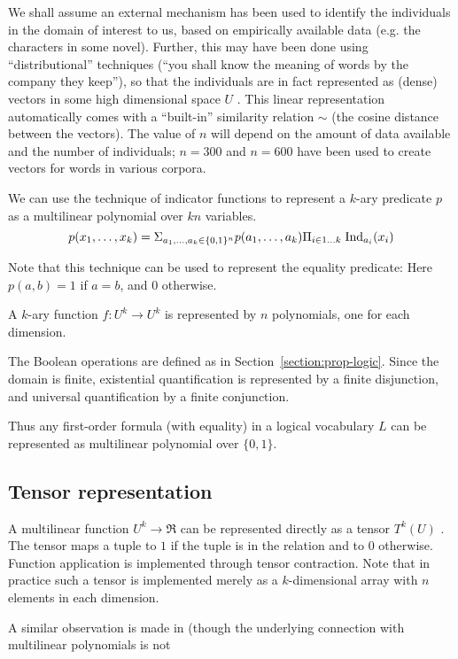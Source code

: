 \documentclass{article} %
\begin{document}
We shall assume an external mechanism has been used to identify the individuals in the domain of interest to us, based on empirically available data (e.g.{} the characters in some novel). Further, this may have been done using ``distributional'' techniques (``you shall know the meaning of words by the company they keep''), so that the individuals are in fact represented as (dense) vectors in some high dimensional space $U$ \cite{word-to-vec}. This linear representation automatically comes with a ``built-in'' similarity relation $\sim$ (the cosine distance between the vectors). The value of $n$ will depend on the amount of data available and the number of individuals; $n=300$ and $n=600$ have been used to create vectors for words in various corpora. 

We can use the technique of indicator functions to represent a $k$-ary predicate $p$ as a multilinear polynomial over $kn$ variables. 
$$p(x_1,\ldots, x_k)= \Sigma_{a_1,\ldots,a_k \in \{0,1\}^n} p(a_1, \ldots, a_k)  \Pi_{i \in 1\ldots k} \;\mbox{Ind}_{a_i}(x_i)$$

\noindent Note that this technique can be used to represent the equality predicate: Here $p(a,b)=1$ if $a=b$, and $0$ otherwise.

A $k$-ary function $f:U^k \rightarrow U^k$ is represented by $n$ polynomials, one for each dimension.

The Boolean operations are defined as in Section~\ref{section:prop-logic}. Since the domain is finite, existential quantification is represented by a finite disjunction, and universal quantification by a finite conjunction. 

Thus any first-order formula (with equality) in a logical vocabulary $L$ can be represented as multilinear polynomial over $\{0,1\}$. 

\subsection{Tensor representation}
A multilinear function $U^k \rightarrow \Re$ can be represented directly as a tensor $T^k(U)$ \cite[Chapter 8]{lee-book-2000}. The tensor maps a tuple  to $1$ if the tuple is in the relation and to $0$ otherwise. Function application is implemented through tensor contraction. Note that in practice such a tensor is implemented merely as a $k$-dimensional array with $n$ elements in each dimension. 

A similar observation is made in \cite{grefenstette-2013} (though the
underlying connection with multilinear polynomials is not 
\end{document}
